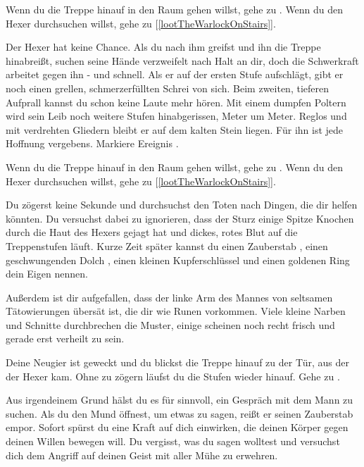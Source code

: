 Wenn du die Treppe hinauf in den Raum gehen willst, gehe zu .
Wenn du den Hexer durchsuchen willst, gehe zu [\ref{lootTheWarlockOnStairs}].


Der Hexer hat keine Chance. Als du nach ihm greifst und ihn die Treppe hinabreißt, suchen seine Hände verzweifelt nach Halt an dir, doch die Schwerkraft arbeitet gegen ihn - und schnell.
Als er auf der ersten Stufe aufschlägt, gibt er noch einen grellen, schmerzerfüllten Schrei von sich. Beim zweiten, tieferen Aufprall kannst du schon keine Laute mehr hören.
Mit einem dumpfen Poltern wird sein Leib noch weitere Stufen hinabgerissen, Meter um Meter.
Reglos und mit verdrehten Gliedern bleibt er auf dem kalten Stein liegen.
Für ihn ist jede Hoffnung vergebens.
Markiere Ereignis .

Wenn du die Treppe hinauf in den Raum gehen willst, gehe zu .
Wenn du den Hexer durchsuchen willst, gehe zu [\ref{lootTheWarlockOnStairs}].


Du zögerst keine Sekunde und durchsuchst den Toten nach Dingen, die dir helfen könnten.
Du versuchst dabei zu ignorieren, dass der Sturz einige Spitze Knochen durch die Haut des Hexers gejagt hat und dickes, rotes Blut auf die Treppenstufen läuft.
Kurze Zeit später kannst du einen Zauberstab , einen geschwungenden Dolch , einen kleinen Kupferschlüssel  und einen goldenen Ring  dein Eigen nennen.

Außerdem ist dir aufgefallen, dass der linke Arm des Mannes von seltsamen Tätowierungen übersät ist, die dir wie Runen vorkommen. Viele kleine Narben und Schnitte durchbrechen die Muster, einige scheinen noch recht frisch und gerade erst verheilt zu sein.

Deine Neugier ist geweckt und du blickst die Treppe hinauf zu der Tür, aus der der Hexer kam. Ohne zu zögern läufst du die Stufen wieder hinauf. Gehe zu .


Aus irgendeinem Grund hälst du es für sinnvoll, ein Gespräch mit dem Mann zu suchen. Als du den Mund öffnest, um etwas zu sagen, reißt er seinen Zauberstab empor.
Sofort spürst du eine Kraft auf dich einwirken, die deinen Körper gegen deinen Willen bewegen will.
Du vergisst, was du sagen wolltest und versuchst dich dem Angriff auf deinen Geist mit aller Mühe zu erwehren.

